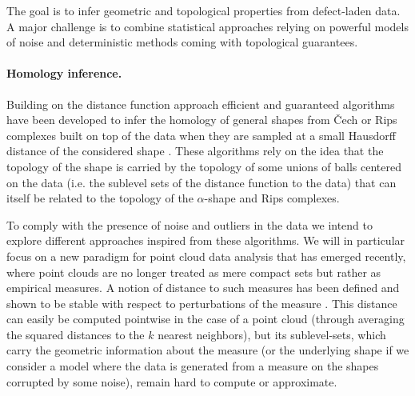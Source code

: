 

The goal is to infer geometric and topological properties from defect-laden data.
 A major challenge is to combine  statistical approaches relying on powerful models of noise and deterministic methods coming with topological guarantees.  



\paragraph{Homology inference.}
Building on the distance function approach efficient and guaranteed algorithms have been developed to infer the homology of general shapes from \v{C}ech or Rips complexes built on top of the data when they are sampled at a small Hausdorff distance of the considered shape \cite{co-tpr-2008}. These algorithms rely on the idea that the topology of the shape is carried by the topology of some unions of balls centered on the data (i.e. the sublevel sets of the distance function to the data) that can itself be related to the topology of the $\alpha$-shape  and Rips complexes.  

To comply with the presence of noise and outliers in the data we intend to explore different approaches inspired from these algorithms.  We will in particular focus on a new paradigm for point cloud data analysis that has emerged recently, where point clouds are no longer treated as mere compact sets but rather as empirical measures. A notion of distance to such measures has been defined and shown to be stable with respect to perturbations of the measure \cite{ccsm-gipm-2011}. This distance can easily be computed pointwise in the case of a point cloud (through averaging the squared distances to the $k$ nearest neighbors), but its sublevel-sets, which carry the geometric information about the measure (or the underlying shape if we consider a model where the data is generated from a measure on the shapes corrupted by some noise), remain hard to compute or approximate.

